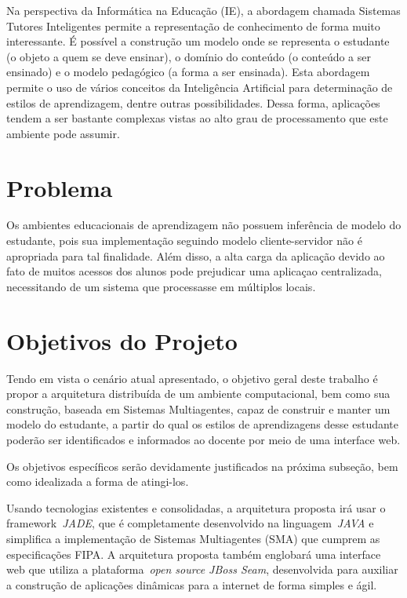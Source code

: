 Na perspectiva da Informática na Educação (IE), a abordagem chamada Sistemas Tutores Inteligentes permite a representação de conhecimento de forma muito interessante. É possível a construção um modelo onde se representa o estudante (o objeto a quem se deve ensinar), o domínio do conteúdo (o conteúdo a ser ensinado) e o modelo pedagógico (a forma a ser ensinada). Esta abordagem permite o uso de vários conceitos da Inteligência Artificial para determinação de estilos de aprendizagem, dentre outras possibilidades. Dessa forma, aplicações tendem a ser bastante complexas vistas ao alto grau de processamento que este ambiente pode assumir.

\section{Problema}
Os ambientes educacionais de aprendizagem não possuem inferência de modelo do estudante, pois sua implementação seguindo modelo cliente-servidor não é apropriada para tal finalidade. Além disso, a alta carga da aplicação devido ao fato de muitos acessos dos alunos pode prejudicar uma aplicaçao centralizada, necessitando de um sistema que processasse em múltiplos locais.

\section{Objetivos do Projeto}
Tendo em vista o cenário atual apresentado, o objetivo geral deste trabalho é propor a arquitetura distribuída de um ambiente computacional, bem como sua construção, baseada em Sistemas Multiagentes, capaz de construir e manter um modelo do estudante, a partir do qual os estilos de aprendizagens desse estudante poderão ser identificados e informados ao docente por meio de uma interface web.

Os objetivos específicos serão devidamente justificados na próxima subseção, bem como idealizada a forma de atingi-los.

Usando tecnologias existentes e consolidadas, a arquitetura proposta irá usar o framework~\emph{JADE}, que é completamente desenvolvido na linguagem~\emph{JAVA} e simplifica a implementação de Sistemas Multiagentes (SMA) que cumprem as especificações FIPA. A arquitetura proposta também englobará uma interface web que utiliza a plataforma~\emph{open source JBoss Seam}, desenvolvida para auxiliar a construção de aplicações dinâmicas para a internet de forma simples e ágil.

